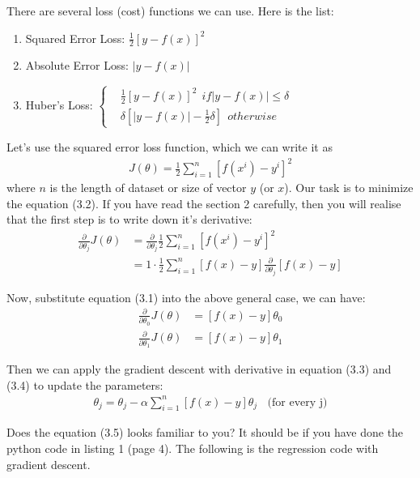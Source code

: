 \documentclass[12pt]{article}
\theoremstyle{definition}
\numberwithin{equation}{section}
\numberwithin{figure}{section}
\numberwithin{table}{section}
\begin{document}
There are several loss (cost) functions we can use. Here is the list:
\begin{enumerate}[label=(\roman*)]
  \item Squared Error Loss: $\frac{1}{2}[y - f(x)]^2$
  \item Absolute Error Loss: $|y - f(x)|$
  \item Huber's Loss: $\begin{cases}
    & \frac{1}{2}[y - f(x)]^2 \ \ if |y - f(x)| \leq \delta \\
    & \delta[|y - f(x)| - \frac{1}{2} \delta] \ \  otherwise
  \end{cases}$
\end{enumerate}

Let's use the squared error loss function, which we can write it as
\begin{align}
  J(\theta) = \frac{1}{2} \sum_{i=1}^n [f(x^i) - y^i]^2
\end{align}
where $n$ is the length of dataset or size of vector $y$ (or $x$). Our task is to minimize the equation (3.2). If you have read the section 2 carefully, then you will realise that the first step is to write down it's derivative:
\begin{align*}
  \frac{\partial }{\partial \theta_j} J(\theta)& = \frac{\partial }{\partial \theta_j} \frac{1}{2} \sum_{i=1}^n [f(x^i) - y^i]^2 \\
  & = 1 \cdot \frac{1}{2}\sum_{i=1}^n [f(x) - y] \frac{\partial }{\partial \theta_j}  [f(x) - y] \tag{chain rule}
\end{align*}

Now, substitute equation (3.1) into the above general case, we can have:
\begin{align}
  \frac{\partial }{\partial \theta_0} J(\theta)& = [f(x) - y] \theta_0 \\
  \frac{\partial }{\partial \theta_1} J(\theta)& = [f(x) - y] \theta_1
\end{align}

Then we can apply the gradient descent with derivative in equation (3.3) and (3.4) to update the parameters:
\begin{align}
  \theta_j = \theta_j - \alpha \sum_{i=1}^n [f(x) -y] \theta_j \ \ \ \ \text{(for every j)}
\end{align}

Does the equation (3.5) looks familiar to you? It should be if you have done the python code in listing 1 (page 4). The following is the regression code with gradient descent. 
\end{document}
